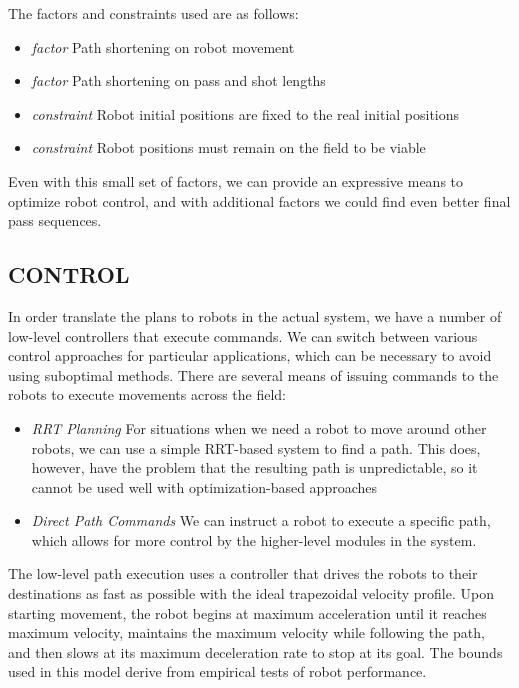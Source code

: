 \documentclass[a4paper, 10pt, conference]{ieeeconf}      %
\begin{document}
The factors and constraints used are as follows:
\begin{itemize}
 \item \textit{factor} Path shortening on robot movement
 \item \textit{factor} Path shortening on pass and shot lengths
 \item \textit{constraint} Robot initial positions are fixed to the real initial positions
 \item \textit{constraint} Robot positions must remain on the field to be viable
\end{itemize}

Even with this small set of factors, we can provide an expressive means to optimize robot control, and with additional factors we could find even better final pass sequences.  

\subsection{CONTROL}
In order translate the plans to robots in the actual system, we have a number of low-level controllers that execute commands. We can switch between various control approaches for particular applications, which can be necessary to avoid using suboptimal methods.  There are several means of issuing commands to the robots to execute movements across the field:
\begin{itemize}
 \item \textit{RRT Planning} For situations when we need a robot to move around other robots, we can use a simple RRT-based system to find a path.  This does, however, have the problem that the resulting path is unpredictable, so it cannot be used well with optimization-based approaches
 \item \textit{Direct Path Commands} We can instruct a robot to execute a specific path, which allows for more control by the higher-level modules in the system.  
 \end{itemize}

The low-level path execution uses a controller that drives the robots to their destinations as fast as possible with the ideal trapezoidal velocity profile.  Upon starting movement, the robot begins at maximum acceleration until it reaches maximum velocity, maintains the maximum velocity while following the path, and then slows at its maximum deceleration rate to stop at its goal.  The bounds used in this model derive from empirical tests of robot performance.  
\end{document}
